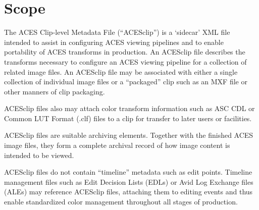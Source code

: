 \cleardoublepage
\numberedformat	
\chapter{Scope} 	%

The ACES Clip-level Metadata File (``ACESclip'') is a `sidecar' XML file intended to assist in configuring ACES viewing pipelines and to enable portability of ACES transforms in production. An ACESclip file describes the transforms necessary to configure an ACES viewing pipeline for a collection of related image files. An ACESclip file may be associated with either a single collection of individual image files or a ``packaged'' clip such as an MXF file or other manners of clip packaging. 

ACESclip files also may attach color transform information such as ASC CDL or Common LUT Format (.clf) files to a clip for transfer to later users or facilities.

ACESclip files are suitable archiving elements. Together with the finished ACES image files, they form a complete archival record of how image content is intended to be viewed.

ACESclip files do not contain ``timeline'' metadata such as edit points. Timeline management files such as Edit Decision Lists (EDLs) or Avid Log Exchange files (ALEs) may reference ACESclip files, attaching them to editing events and thus enable standardized color management throughout all stages of production.
